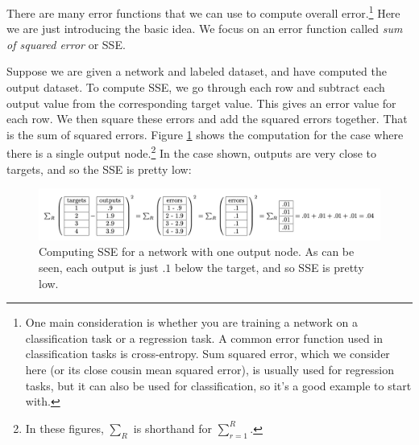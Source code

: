 There are many error functions that we can use to compute overall error.\footnote{One main consideration is whether you are training a network on a classification task or a regression task.  A common error function used in classification tasks is cross-entropy.  Sum squared error, which we consider here (or its close cousin mean squared error), is usually used for regression tasks, but it can also be used for classification, so it's a good example to start with.} Here we are just introducing the basic idea. We focus on an error function called \emph{sum of squared error} or SSE. 

Suppose we are given a network and labeled dataset, and have computed the output dataset. To compute SSE, we go through each row and subtract each output value from the corresponding target value. This gives an error value for each row. We then square these errors and add the squared errors together. That is the sum of squared errors. Figure \ref{error_computation1} shows the computation for the case where there is a single output node.\footnote{In these figures, $\sum_R$ is shorthand for $\sum_{r=1}^{R}$.}  In the case shown, outputs are very close to targets, and so the SSE is pretty low:

\begin{figure}[h]
\centering
\includegraphics[scale=.5]{./images/ErrorComputation_1.png}
\caption[Jeff Yoshimi.]{Computing SSE for a network with one output node. As can be seen, each output is just $.1$ below the target, and so SSE is pretty low. }
\label{error_computation1}
\end{figure}

